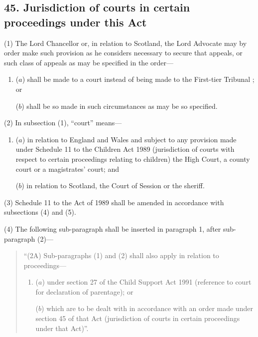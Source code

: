 \documentclass[12pt,a4paper]{article}
\begin{document}
\subsection{45. Jurisdiction of courts in certain proceedings under this Act}

(1) The Lord Chancellor or, in relation to Scotland, the Lord Advocate may by order make such provision as he considers necessary to secure that appeals, or such class of appeals as may be specified in the order—
\begin{enumerate}\item[]
($a$) shall be made to a court instead of being made to 
the First-tier Tribunal%
; or

($b$) shall be so made in such circumstances as may be so specified.
\end{enumerate}

(2) In subsection (1), “court” means—
\begin{enumerate}\item[]
($a$) in relation to England and Wales and subject to any provision made under Schedule 11 to the Children Act 1989 (jurisdiction of courts with respect to certain proceedings relating to children) the High Court, a county court or a magistrates' court; and

($b$) in relation to Scotland, the Court of Session or the sheriff.
\end{enumerate}

(3) Schedule 11 to the Act of 1989 shall be amended in accordance with subsections (4)  and (5).

(4) The following sub-paragraph shall be inserted in paragraph 1, after sub-paragraph (2)—
\begin{quotation}
“(2A) Sub-paragraphs (1)  and (2)  shall also apply in relation to proceedings—
\begin{enumerate}\item[]
($a$) under section 27 of the Child Support Act 1991 (reference to court for declaration of parentage); or

($b$) which are to be dealt with in accordance with an order made under section 45 of that Act (jurisdiction of courts in certain proceedings under that Act)”.
\end{enumerate}
\end{quotation}
\end{document}
